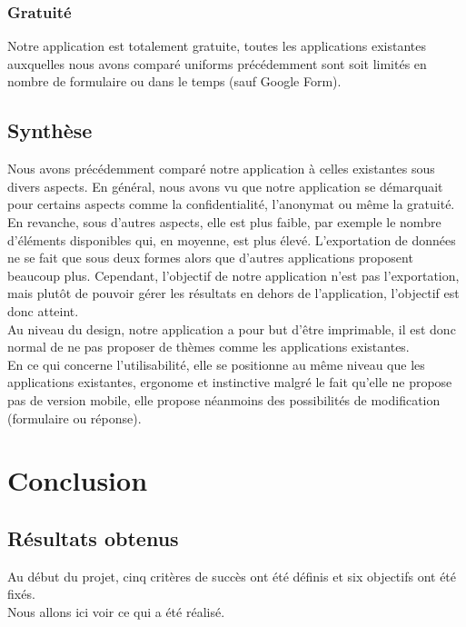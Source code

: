 \documentclass{sigplanconf}
\begin{document}
\subsubsection{Gratuité}
Notre application est totalement gratuite, toutes les applications existantes auxquelles nous avons comparé uniforms précédemment sont soit limités en nombre de formulaire ou dans le temps (sauf Google Form).

\subsection{Synthèse}
Nous avons précédemment comparé notre application à celles existantes sous divers aspects. En général, nous avons vu que notre application se démarquait pour certains aspects comme la confidentialité, l’anonymat ou même la gratuité.\\
En revanche, sous d’autres aspects, elle est plus faible, par exemple le nombre d’éléments disponibles qui, en moyenne, est plus élevé. L’exportation de données ne se fait que sous deux formes alors que d’autres applications proposent beaucoup plus. Cependant, l’objectif de notre application n’est pas l’exportation, mais plutôt de pouvoir gérer les résultats en dehors de l’application, l’objectif est donc atteint. \\
Au niveau du design, notre application a pour but d’être imprimable, il est donc normal de ne pas proposer de thèmes comme les applications existantes.\\
En ce qui concerne l’utilisabilité, elle se positionne au même niveau que les applications existantes, ergonome et instinctive malgré le fait qu’elle ne propose pas de version mobile, elle propose néanmoins des possibilités de modification (formulaire ou réponse).

\section{Conclusion}
\subsection{Résultats obtenus}
Au début du projet, cinq critères de succès ont été définis et six objectifs ont été fixés.\\ 
Nous allons ici voir ce qui a été réalisé. 
\end{document}
